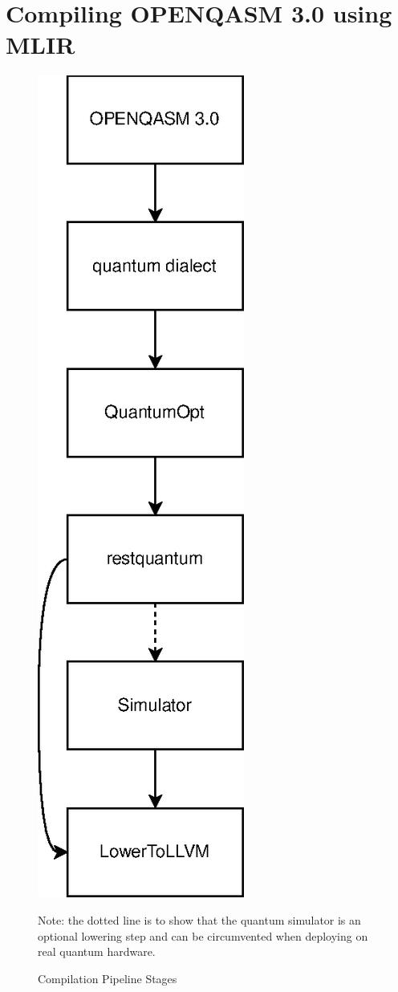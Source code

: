\section{Compiling OPENQASM 3.0 using MLIR}

\begin{figure}[ht]
    \centering
    \includegraphics{images/pipeline.eps}
    \caption[caption]{Compilation Pipeline Stages}
    \medskip
    \small
    Note: the dotted line is to show that the quantum simulator
    is an optional lowering step and can be circumvented when deploying on 
    real quantum hardware.
    \label{fig:compilation_pipeline}

\end{figure}


